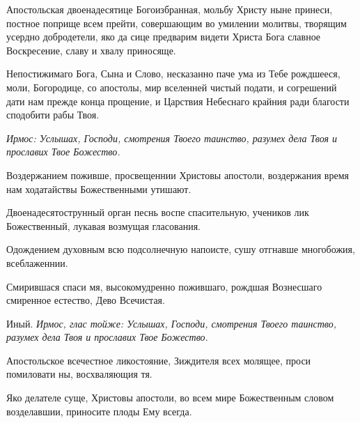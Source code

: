 

Апостольская двоенадесятице Богоизбранная, мольбу Христу ныне принеси, постное поприще всем прейти, совершающим во умилении молитвы, творящим усердно добродетели, яко да сице предварим видети Христа Бога славное Воскресение, славу и хвалу приносяще. 





Непостижимаго Бога, Сына и Слово, несказанно паче ума из Тебе рождшееся, моли, Богородице, со апостолы, мир вселенней чистый подати, и согрешений дати нам прежде конца прощение, и Царствия Небеснаго крайния ради благости сподобити рабы Твоя. 






\itshape Ирмос\normalfont{}: Услышах, Господи, смотрения Твоего таинство, разумех дела Твоя и прославих Твое Божество.




Воздержанием поживше, просвещеннии Христовы апостоли, воздержания время нам ходатайствы Божественными утишают.




Двоенадесятострунный орган песнь воспе спасительную, учеников лик Божественный, лукавая возмущая гласования.




Одождением духовным всю подсолнечную напоисте, сушу отгнавше многобожия, всеблаженнии.




Смирившася спаси мя, высокомудренно пожившаго, рождшая Вознесшаго смиренное естество, Дево Всечистая.


Иный. \itshape Ирмос\normalfont{}, глас тойже: Услышах, Господи, смотрения Твоего таинство, разумех дела Твоя и прославих Твое Божество.




Апостольское всечестное ликостояние, Зиждителя всех молящее, проси помиловати ны, восхваляющия тя.




Яко делателе суще, Христовы апостоли, во всем мире Божественным словом возделавшии, приносите плоды Ему всегда.



